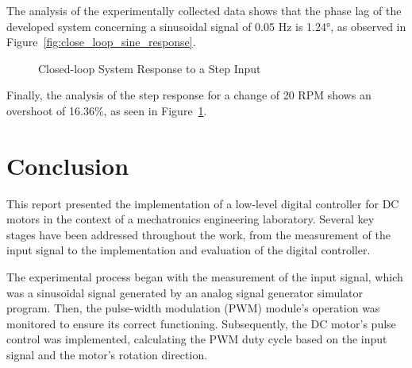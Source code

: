 \documentclass[conference,onecolumn]{IEEEtran}
\begin{document}
The analysis of the experimentally collected data shows that the phase lag of the developed system concerning a sinusoidal signal of 0.05 Hz is 1.24°, as observed in Figure~\ref{fig:close_loop_sine_response}.

\begin{figure}[H]
    \centering
    \caption{Closed-loop System Response to a Step Input}
    \label{fig:close_loop_step_response}
\end{figure}
Finally, the analysis of the step response for a change of 20 RPM shows an overshoot of 16.36\%, as seen in Figure~\ref{fig:close_loop_step_response}.

\section{Conclusion}
This report presented the implementation of a low-level digital controller for DC motors in the context of a mechatronics engineering laboratory. Several key stages have been addressed throughout the work, from the measurement of the input signal to the implementation and evaluation of the digital controller.

The experimental process began with the measurement of the input signal, which was a sinusoidal signal generated by an analog signal generator simulator program. Then, the pulse-width modulation (PWM) module's operation was monitored to ensure its correct functioning. Subsequently, the DC motor's pulse control was implemented, calculating the PWM duty cycle based on the input signal and the motor's rotation direction.
\end{document}
